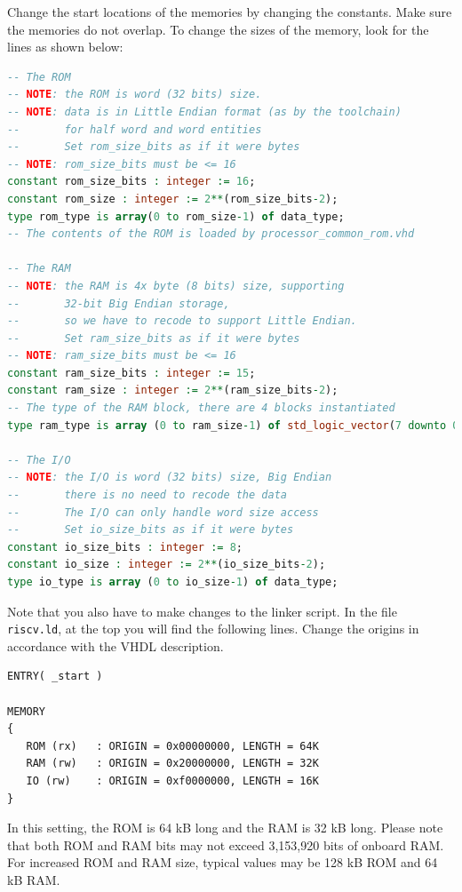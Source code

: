 \documentclass[12pt]{article}
\begin{document}
Change the start locations of the memories by changing the constants. Make sure the memories do not overlap. To change the sizes of the memory, look for the lines as shown below:

\begin{lstlisting}[language=VHDL]
-- The ROM
-- NOTE: the ROM is word (32 bits) size.
-- NOTE: data is in Little Endian format (as by the toolchain)
--       for half word and word entities
--       Set rom_size_bits as if it were bytes
-- NOTE: rom_size_bits must be <= 16
constant rom_size_bits : integer := 16;
constant rom_size : integer := 2**(rom_size_bits-2);
type rom_type is array(0 to rom_size-1) of data_type;
-- The contents of the ROM is loaded by processor_common_rom.vhd

-- The RAM
-- NOTE: the RAM is 4x byte (8 bits) size, supporting
--       32-bit Big Endian storage,
--       so we have to recode to support Little Endian.
--       Set ram_size_bits as if it were bytes
-- NOTE: ram_size_bits must be <= 16
constant ram_size_bits : integer := 15;
constant ram_size : integer := 2**(ram_size_bits-2);
-- The type of the RAM block, there are 4 blocks instantiated
type ram_type is array (0 to ram_size-1) of std_logic_vector(7 downto 0);
                    
-- The I/O
-- NOTE: the I/O is word (32 bits) size, Big Endian
--       there is no need to recode the data
--       The I/O can only handle word size access
--       Set io_size_bits as if it were bytes
constant io_size_bits : integer := 8;
constant io_size : integer := 2**(io_size_bits-2);
type io_type is array (0 to io_size-1) of data_type;
\end{lstlisting}

Note that you also have to make changes to the linker script. In the file \texttt{riscv.ld}, at the top you will find the following lines. Change the origins in accordance with the VHDL description.

\begin{lstlisting}
ENTRY( _start )

MEMORY
{
   ROM (rx)   : ORIGIN = 0x00000000, LENGTH = 64K
   RAM (rw)   : ORIGIN = 0x20000000, LENGTH = 32K
   IO (rw)    : ORIGIN = 0xf0000000, LENGTH = 16K
}
\end{lstlisting}

In this setting, the ROM is 64 kB long and the RAM is 32 kB long. Please note that both ROM and RAM bits may not exceed 3,153,920 bits of onboard RAM. For increased ROM and RAM size, typical values may be 128 kB ROM and 64 kB RAM.
\end{document}
